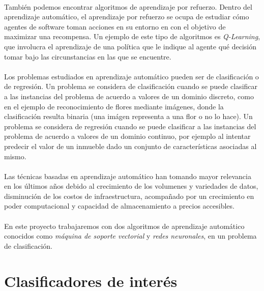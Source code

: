 \paragraph{}También podemos encontrar algoritmos de aprendizaje por refuerzo. Dentro del aprendizaje automático, el aprendizaje por refuerzo se ocupa de estudiar cómo agentes de software toman acciones en su entorno en con el objetivo de maximizar una recompensa. Un ejemplo de este tipo de algoritmos es \textit{Q-Learning}, que involucra el aprendizaje de una política que le indique al agente qué decisión tomar bajo las circunstancias en las que se encuentre.

\paragraph{}Los problemas estudiados en aprendizaje automático pueden ser de clasificación o de regresión. Un problema se considera de clasificación cuando se puede clasificar a las instancias del problema de acuerdo a valores de un dominio discreto, como en el ejemplo de reconocimiento de flores mediante imágenes, donde la clasificación resulta binaria (una imágen representa a una flor o no lo hace). Un problema se considera de regresión cuando se puede clasificar a las instancias del problema de acuerdo a valores de un dominio continuo, por ejemplo al intentar predecir el valor de un inmueble dado un conjunto de características asociadas al mismo.

\paragraph{}Las técnicas basadas en aprendizaje automático han tomando mayor relevancia en los últimos años debido al crecimiento de los volumenes y variedades de datos, disminución de los costos de infraestructura, acompañado por un crecimiento en poder computacional y capacidad de almacenamiento a precios accesibles.

\paragraph{}En este proyecto trabajaremos con dos algoritmos de aprendizaje automático conocidos como \textit{máquina de soporte vectorial} y \textit{redes neuronales}, en un problema de clasificación.

\section{Clasificadores de interés}






